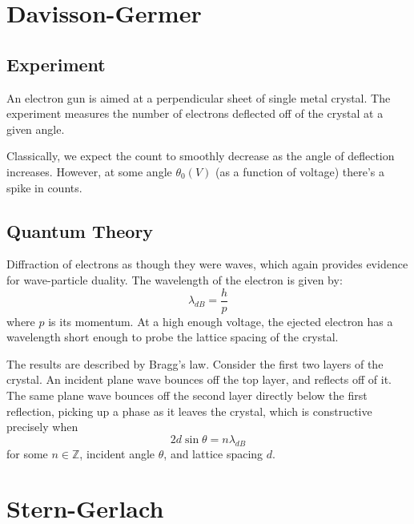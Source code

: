 \documentclass{article}
\begin{document}
\section{Davisson-Germer}

\subsection{Experiment}
An electron gun is aimed at a perpendicular sheet of single metal crystal. The experiment
measures the number of electrons deflected off of the crystal at a given angle.

Classically, we expect the count to smoothly decrease as the angle of deflection
increases. However, at some angle $\theta_0(V)$ (as a function of voltage)
there's a spike in counts.

\subsection{Quantum Theory}
Diffraction of electrons as though they were waves, which again provides evidence
for wave-particle duality. The wavelength of the electron is given by:
\begin{equation*}
	\lambda_{dB} = \frac{h}{p}
\end{equation*}
where $p$ is its momentum. At a high enough voltage, the ejected electron has a
wavelength short enough to probe the lattice spacing of the crystal.

The results are described by Bragg's law. Consider the first two layers of the
crystal. An incident plane wave bounces off the top layer, and reflects off of it.
The same plane wave bounces off the second layer directly below the first reflection,
picking up a phase as it leaves the crystal, which is constructive precisely when
\begin{equation*}
	2 d \sin \theta = n \lambda_{dB}
\end{equation*}
for some $n \in \mathbb{Z}$, incident angle $\theta$, and lattice spacing $d$.

\section{Stern-Gerlach}
\end{document}

